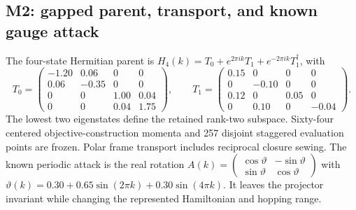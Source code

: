 \documentclass[11pt]{article}
\begin{document}
\subsection{M2: gapped parent, transport, and known gauge attack}\label{supp:m2}
The four-state Hermitian parent is $H_4(k)=T_0+e^{2\pi ik}T_1+e^{-2\pi ik}T_1^\dagger$, with
\[
T_0=\begin{pmatrix}-1.20&0.06&0&0\\0.06&-0.35&0&0\\0&0&1.00&0.04\\0&0&0.04&1.75\end{pmatrix},\qquad
T_1=\begin{pmatrix}0.15&0&0&0\\0&-0.10&0&0\\0.12&0&0.05&0\\0&0.10&0&-0.04\end{pmatrix}.
\]
The lowest two eigenstates define the retained rank-two subspace. Sixty-four centered objective-construction momenta and 257 disjoint staggered evaluation points are frozen. Polar frame transport includes reciprocal closure sewing. The known periodic attack is the real rotation $A(k)=\left(\begin{smallmatrix}\cos\vartheta&-\sin\vartheta\\\sin\vartheta&\cos\vartheta\end{smallmatrix}\right)$ with $\vartheta(k)=0.30+0.65\sin(2\pi k)+0.30\sin(4\pi k)$. It leaves the projector invariant while changing the represented Hamiltonian and hopping range.
\end{document}
